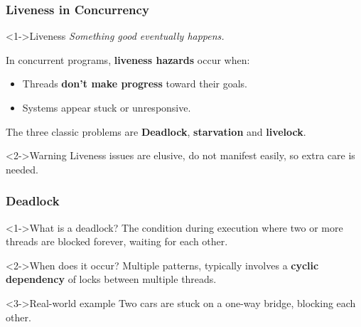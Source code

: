 \documentclass[xcolor={dvipsnames,svgnames},aspectratio=169]{beamer}
\begin{document}
\begin{frame}[fragile]
  \frametitle{Liveness in Concurrency}

  \begin{block}<1->{\faSearch \quad Liveness}
    \emph{Something good eventually happens.}
  \end{block}

  In concurrent programs, \textbf{liveness hazards} occur when:

  \begin{itemize}
  \item[\faUserInjured]<1-> Threads \textbf{don't make progress} toward their
    goals.
  \item[\faUserInjured]<1-> Systems appear stuck or unresponsive.
  \end{itemize}

  The three classic problems are \textbf{Deadlock}, \textbf{starvation} and
  \textbf{livelock}.

  \vspace{0.2cm}

  \begin{block}<2->{\faExclamationTriangle \quad Warning}
    Liveness issues are elusive, do not manifest easily, so extra care is
    needed.
  \end{block}

\end{frame}

\begin{frame}[fragile]
  \frametitle{\faSkull \quad Deadlock}

  \begin{block}<1->{\faSearch \quad What is a deadlock?}
    The condition during execution where two or more threads are blocked
    forever, waiting for each other.
  \end{block}

    \vspace{0.5cm}

    \begin{block}<2->{\faSearch \quad When does it occur?}
    Multiple patterns, typically involves a \textbf{cyclic dependency} of locks
    between multiple threads.
  \end{block}

  \vspace{0.5cm}

  \begin{block}<3->{\faSearch \quad Real-world example}
    Two cars are stuck on a one-way bridge, blocking each other.
  \end{block}
\end{frame}
\end{document}
